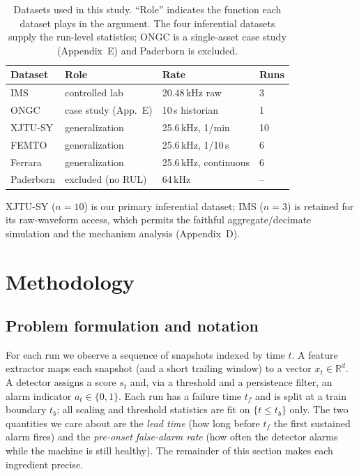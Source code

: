 \documentclass[journal]{IEEEtran}
\begin{document}
\begin{table}[t]
\caption{Datasets used in this study. ``Role'' indicates the function each
dataset plays in the argument. The four inferential datasets supply the run-level
statistics; ONGC is a single-asset case study (Appendix~E) and Paderborn is
excluded.}
\label{tab:datasets}
\centering
\footnotesize
\begin{tabular}{@{}llll@{}}
\toprule
Dataset & Role & Rate & Runs \\
\midrule
IMS \cite{qiu2006}      & controlled lab     & 20.48\,kHz raw    & 3 \\
ONGC                    & case study (App.~E) & 10\,s historian   & 1 \\
XJTU-SY \cite{wang2020} & generalization     & 25.6\,kHz, 1/min  & 10 \\
FEMTO \cite{nectoux2012}& generalization     & 25.6\,kHz, 1/10\,s& 6 \\
Ferrara \cite{arpa2024} & generalization     & 25.6\,kHz, continuous & 6 \\
Paderborn \cite{lessmeier2016} & excluded (no RUL) & 64\,kHz    & -- \\
\bottomrule
\end{tabular}
\end{table}

XJTU-SY ($n{=}10$) is our primary inferential dataset; IMS ($n{=}3$) is retained
for its raw-waveform access, which permits the faithful aggregate/decimate
simulation and the mechanism analysis (Appendix~D).

\section{Methodology}

\subsection{Problem formulation and notation}
For each run we observe a sequence of snapshots indexed by time $t$. A feature
extractor maps each snapshot (and a short trailing window) to a vector
$x_t \in \mathbb{R}^d$. A detector assigns a score $s_t$ and, via a threshold
and a persistence filter, an alarm indicator $a_t \in \{0,1\}$. Each run has a
failure time $t_f$ and is split at a train boundary $t_b$; all scaling and
threshold statistics are fit on $\{t \le t_b\}$ only. The two quantities we
care about are the \emph{lead time} (how long before $t_f$ the first sustained
alarm fires) and the \emph{pre-onset false-alarm rate} (how often the detector
alarms while the machine is still healthy). The remainder of this section makes
each ingredient precise.
\end{document}

